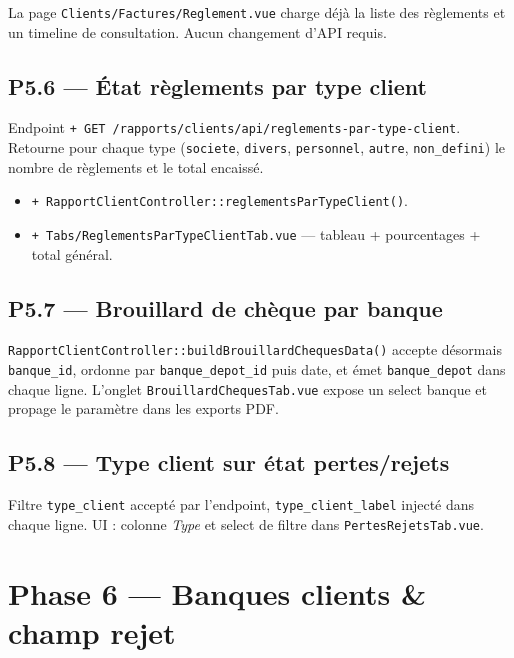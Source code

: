 \documentclass[11pt,a4paper]{article}
\newcommand{\modfile}[1]{\texttt{\small #1}}
\newcommand{\newfile}[1]{\texttt{\small\textcolor{accent}{+ #1}}}
\begin{document}
La page \modfile{Clients/Factures/Reglement.vue} charge déjà la liste des
règlements et un timeline de consultation. Aucun changement d'API requis.

\subsection{P5.6 --- État règlements par type client}

Endpoint \newfile{GET /rapports/clients/api/reglements-par-type-client}.
Retourne pour chaque type (\texttt{societe}, \texttt{divers}, \texttt{personnel},
\texttt{autre}, \texttt{non\_defini}) le nombre de règlements et le total encaissé.

\begin{itemize}[leftmargin=1.4em]
  \item \newfile{RapportClientController::reglementsParTypeClient()}.
  \item \newfile{Tabs/ReglementsParTypeClientTab.vue} --- tableau + pourcentages +
    total général.
\end{itemize}

\subsection{P5.7 --- Brouillard de chèque par banque}

\modfile{RapportClientController::buildBrouillardChequesData()} accepte
désormais \texttt{banque\_id}, ordonne par \texttt{banque\_depot\_id} puis
date, et émet \texttt{banque\_depot} dans chaque ligne. L'onglet
\modfile{BrouillardChequesTab.vue} expose un select banque et propage le
paramètre dans les exports PDF.

\subsection{P5.8 --- Type client sur état pertes/rejets}

Filtre \texttt{type\_client} accepté par l'endpoint,
\texttt{type\_client\_label} injecté dans chaque ligne. UI : colonne
\emph{Type} et select de filtre dans \modfile{PertesRejetsTab.vue}.

\newpage

\section{Phase 6 --- Banques clients \& champ rejet}
\end{document}
